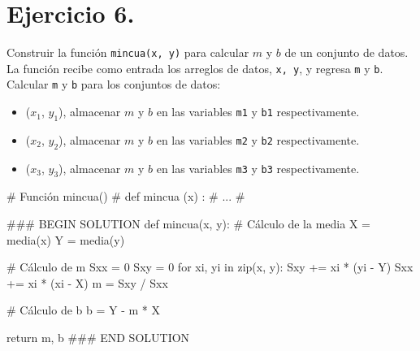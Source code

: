 \documentclass[
  letterpaper,
  DIV=11,
  numbers=noendperiod]{scrreprt}
\newenvironment{Shaded}{\begin{snugshade}}{\end{snugshade}}
\newcommand{\BuiltInTok}[1]{\textcolor[rgb]{0.00,0.23,0.31}{#1}}
\newcommand{\CommentTok}[1]{\textcolor[rgb]{0.37,0.37,0.37}{#1}}
\newcommand{\ControlFlowTok}[1]{\textcolor[rgb]{0.00,0.23,0.31}{#1}}
\newcommand{\DecValTok}[1]{\textcolor[rgb]{0.68,0.00,0.00}{#1}}
\newcommand{\KeywordTok}[1]{\textcolor[rgb]{0.00,0.23,0.31}{#1}}
\newcommand{\NormalTok}[1]{\textcolor[rgb]{0.00,0.23,0.31}{#1}}
\newcommand{\OperatorTok}[1]{\textcolor[rgb]{0.37,0.37,0.37}{#1}}
\newcommand{\RegionMarkerTok}[1]{\textcolor[rgb]{0.00,0.23,0.31}{#1}}
\providecommand{\tightlist}{%
  \setlength{\itemsep}{0pt}\setlength{\parskip}{0pt}}\usepackage{longtable,booktabs,array}
\begin{document}
\section{\texorpdfstring{\textbf{Ejercicio
6.}}{Ejercicio 6.}}\label{ejercicio-6.}

Construir la función \texttt{mincua(x,\ y)} para calcular \(m\) y \(b\)
de un conjunto de datos. La función recibe como entrada los arreglos de
datos, \texttt{x,\ y}, y regresa \texttt{m} y \texttt{b}. Calcular
\texttt{m} y \texttt{b} para los conjuntos de datos:

\begin{itemize}
\tightlist
\item
  (\(x_1\), \(y_1\)), almacenar \(m\) y \(b\) en las variables
  \texttt{m1} y \texttt{b1} respectivamente.
\item
  (\(x_2\), \(y_2\)), almacenar \(m\) y \(b\) en las variables
  \texttt{m2} y \texttt{b2} respectivamente.
\item
  (\(x_3\), \(y_3\)), almacenar \(m\) y \(b\) en las variables
  \texttt{m3} y \texttt{b3} respectivamente.
\end{itemize}

\begin{Shaded}
\begin{Highlighting}[]
\CommentTok{\# Función mincua()}
\CommentTok{\# def mincua (x) : }
\CommentTok{\# ...}
\CommentTok{\# }

\CommentTok{\#\#\# }\RegionMarkerTok{BEGIN}\CommentTok{ SOLUTION}
\KeywordTok{def}\NormalTok{ mincua(x, y):}
    \CommentTok{\# Cálculo de la media}
\NormalTok{    X }\OperatorTok{=}\NormalTok{ media(x)}
\NormalTok{    Y }\OperatorTok{=}\NormalTok{ media(y)}
    
    \CommentTok{\# Cálculo de m}
\NormalTok{    Sxx }\OperatorTok{=} \DecValTok{0}
\NormalTok{    Sxy }\OperatorTok{=} \DecValTok{0}
    \ControlFlowTok{for}\NormalTok{ xi, yi }\KeywordTok{in} \BuiltInTok{zip}\NormalTok{(x, y):}
\NormalTok{        Sxy }\OperatorTok{+=}\NormalTok{ xi }\OperatorTok{*}\NormalTok{ (yi }\OperatorTok{{-}}\NormalTok{ Y)}
\NormalTok{        Sxx }\OperatorTok{+=}\NormalTok{ xi }\OperatorTok{*}\NormalTok{ (xi }\OperatorTok{{-}}\NormalTok{ X)}
\NormalTok{    m }\OperatorTok{=}\NormalTok{ Sxy }\OperatorTok{/}\NormalTok{ Sxx}

    \CommentTok{\# Cálculo de b}
\NormalTok{    b }\OperatorTok{=}\NormalTok{ Y }\OperatorTok{{-}}\NormalTok{ m }\OperatorTok{*}\NormalTok{ X}

    \ControlFlowTok{return}\NormalTok{ m, b}
\CommentTok{\#\#\# }\RegionMarkerTok{END}\CommentTok{ SOLUTION}
\end{Highlighting}
\end{Shaded}
\end{document}
